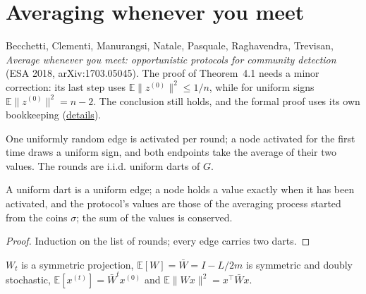 \section{Averaging whenever you meet}\label{sec:bcmnprt-opportunistic}
Becchetti, Clementi, Manurangsi, Natale, Pasquale, Raghavendra, Trevisan, \emph{Average whenever
you meet: opportunistic protocols for community detection} (ESA 2018, arXiv:1703.05045).
The proof of Theorem~4.1 needs a minor correction: its last step uses
$\mathbb E\|z^{(0)}\|^2\le 1/n$, while for uniform signs $\mathbb E\|z^{(0)}\|^2=n-2$. The
conclusion still holds, and the formal proof uses its own bookkeeping
(\href{https://github.com/formal-dynamics/leanamics/blob/main/averaging/FORMALIZATION_DIFFERENCES.md#averaging-whenever-you-meet-opportunistic-avg-3}{details}).
\begin{definition}\label{def:opp}
\leanok
One uniformly random edge is activated per round; a node activated for the first time draws a
uniform sign, and both endpoints take the average of their two values. The rounds are i.i.d.
uniform darts of $G$.
\end{definition}
\begin{lemma}\label{lem:opp-model}
\leanok{}
A uniform dart is a uniform edge; a node holds a value exactly when it has been activated, and
the protocol's values are those of the averaging process started from the coins $\sigma$; the sum
of the values is conserved.
\end{lemma}
\begin{proof}\leanok
Induction on the list of rounds; every edge carries two darts.
\end{proof}
\begin{theorem}\label{thm:opp-first}
\leanok{}
$W_t$ is a symmetric projection, $\mathbb E[W]=\bar W=I-L/2m$ is symmetric and doubly stochastic,
$\mathbb E[x^{(t)}]=\bar W^tx^{(0)}$ and $\mathbb E\|Wx\|^2=x^\top\bar Wx$.
\end{theorem}
